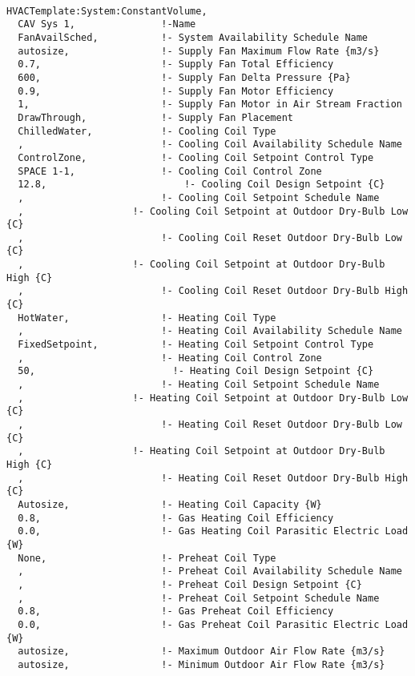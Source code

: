 \begin{lstlisting}

HVACTemplate:System:ConstantVolume,
  CAV Sys 1,               !-Name
  FanAvailSched,           !- System Availability Schedule Name
  autosize,                !- Supply Fan Maximum Flow Rate {m3/s}
  0.7,                     !- Supply Fan Total Efficiency
  600,                     !- Supply Fan Delta Pressure {Pa}
  0.9,                     !- Supply Fan Motor Efficiency
  1,                       !- Supply Fan Motor in Air Stream Fraction
  DrawThrough,             !- Supply Fan Placement
  ChilledWater,            !- Cooling Coil Type
  ,                        !- Cooling Coil Availability Schedule Name
  ControlZone,             !- Cooling Coil Setpoint Control Type
  SPACE 1-1,               !- Cooling Coil Control Zone
  12.8,                        !- Cooling Coil Design Setpoint {C}
  ,                        !- Cooling Coil Setpoint Schedule Name
  ,                   !- Cooling Coil Setpoint at Outdoor Dry-Bulb Low {C}
  ,                        !- Cooling Coil Reset Outdoor Dry-Bulb Low {C}
  ,                   !- Cooling Coil Setpoint at Outdoor Dry-Bulb High {C}
  ,                        !- Cooling Coil Reset Outdoor Dry-Bulb High {C}
  HotWater,                !- Heating Coil Type
  ,                        !- Heating Coil Availability Schedule Name
  FixedSetpoint,           !- Heating Coil Setpoint Control Type
  ,                        !- Heating Coil Control Zone
  50,                        !- Heating Coil Design Setpoint {C}
  ,                        !- Heating Coil Setpoint Schedule Name
  ,                   !- Heating Coil Setpoint at Outdoor Dry-Bulb Low {C}
  ,                        !- Heating Coil Reset Outdoor Dry-Bulb Low {C}
  ,                   !- Heating Coil Setpoint at Outdoor Dry-Bulb High {C}
  ,                        !- Heating Coil Reset Outdoor Dry-Bulb High {C}
  Autosize,                !- Heating Coil Capacity {W}
  0.8,                     !- Gas Heating Coil Efficiency
  0.0,                     !- Gas Heating Coil Parasitic Electric Load {W}
  None,                    !- Preheat Coil Type
  ,                        !- Preheat Coil Availability Schedule Name
  ,                        !- Preheat Coil Design Setpoint {C}
  ,                        !- Preheat Coil Setpoint Schedule Name
  0.8,                     !- Gas Preheat Coil Efficiency
  0.0,                     !- Gas Preheat Coil Parasitic Electric Load {W}
  autosize,                !- Maximum Outdoor Air Flow Rate {m3/s}
  autosize,                !- Minimum Outdoor Air Flow Rate {m3/s}

\end{lstlisting}
